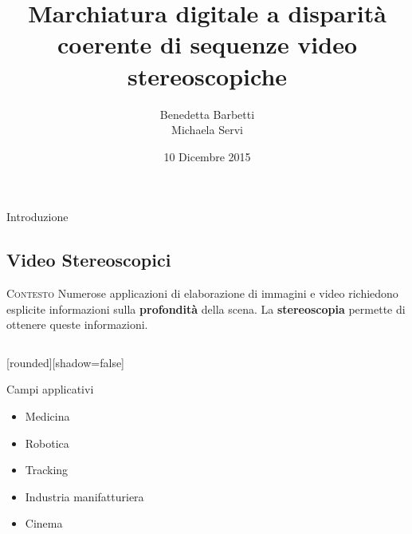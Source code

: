 \documentclass{beamer}
\title{Marchiatura digitale a disparit\`{a} coerente di sequenze video stereoscopiche}
\author{Benedetta Barbetti\\ 
		Michaela Servi}
\institute{Universit\`{a} degli studi di Firenze}
\date{10 Dicembre 2015}
\begin{document}
\begin{frame}
\titlepage
\end{frame}

\begin{section}{Introduzione}
\subsection{Video Stereoscopici}

\begin{frame}[t]{\textsc{Contesto}}
\centering
Numerose applicazioni di elaborazione di immagini e video richiedono esplicite informazioni sulla \textbf{profondit\`{a}} della scena. La \textbf{stereoscopia} permette di ottenere queste informazioni.
\setlength{\columnsep}{0cm}
\begin{columns}
\begin{column}{4cm}
\begin{center}
[rounded][shadow=false]
\begin{block}{Campi applicativi}
		\begin{itemize}
			\item \small{Medicina} 
			\item Robotica
			\item Tracking
			\item Industria manifatturiera
			\item Cinema
		\end{itemize}	
	\end{block}
	


\end{center}
\end{column}
\end{columns}
\end{frame}
\end{section}
\end{document}
